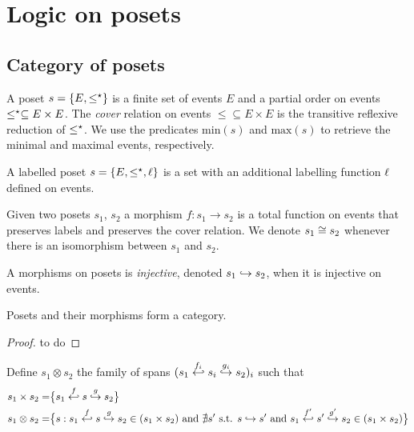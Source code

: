 \section{Logic on posets}

\subsection{Category of posets}
\label{sec:posets}

\begin{definition}[Poset]
  \label{def:poset}
  A poset $s=\{E,\leq^{\star}\}$ is a finite set of events $E$ and a partial order on events $\leq^{\star}\subseteq E\times E$. The \emph{cover} relation on events $\leq\subseteq E\times E$ is the transitive reflexive reduction of $\leq^{\star}$.
  We use the predicates $\text{min}(s)$ and $\text{max}(s)$ to retrieve the minimal and maximal events, respectively.

  A labelled poset $s=\{E,\leq^{\star},\ell\}$ is a set with an additional labelling function $\ell$ defined on events.
\end{definition}

\begin{definition}
  Given two posets $s_1$, $s_2$ a morphism $f:s_1\to s_2$ is a total function on events that preserves labels and preserves the cover relation. We denote $s_1\cong s_2$ whenever there is an isomorphism between $s_1$ and $s_2$.

  A morphisms on posets is \emph{injective}, denoted $s_1\hookrightarrow s_2$, when it is injective on events.
\end{definition}

\begin{lemma}
  Posets and their morphisms form a category.
\end{lemma}
\begin{mdframed}[backgroundcolor=blue!20]
  \begin{proof}
    to do
  \end{proof}
\end{mdframed}

\begin{definition}
\label{def:posets_otimes}
  Define $s_1\otimes s_2$ the family of spans $(s_1\overset{f_i}{\hookleftarrow} s_i\overset{g_i}{\hookrightarrow} s_2)_i$ such that
  \begin{align*}
    s_1\times s_2 =& \big\{ s_1\overset{f}{\hookleftarrow} s\overset{g}{\hookrightarrow} s_2 \big\}\\
    s_1\otimes s_2 =& \big\{ s : s_1\overset{f}{\hookleftarrow} s\overset{g}{\hookrightarrow} s_2\in (s_1\times s_2)\text{ and }\nexists s'\text{ s.t. }s\hookrightarrow s'
    \text{ and }s_1\overset{f'}{\hookleftarrow} s'\overset{g'}{\hookrightarrow} s_2\in (s_1\times s_2)\big\}
  \end{align*}
\end{definition}

